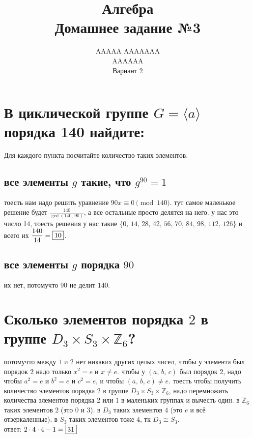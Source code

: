 \documentclass{article}
\title{Алгебра \\ Домашнее задание №3}
\author{AAAAA AAAAAAA \\ AAAAAA \\ Вариант 2}
\newcommand{\ds}{\displaystyle}
\newcommand{\Z}{\mathbb{Z}}
\renewcommand{\f}{\frac}
\begin{document}
  \maketitle

  \section{В циклической группе $G = \langle a \rangle$ порядка 140 найдите:}
  Для каждого пункта посчитайте количество таких элементов.
  \subsection{все элементы $g$ такие, что $g^{90} = 1$}
  тоесть нам надо решить уравнение $90x \equiv 0 \pmod{140}$.
  тут самое маленькое решение будет $\ds\f{140}{\gcd(140,\,90)}$,
  а все остальные просто делятся на него.
  у нас это число 14, тоесть решения у нас такие $\{0,\,14,\,28,\,42,\,56,\,70,\,84,\,98,\,112,\,126\}$
  и всего их $\ds \f{140}{14} = \fbox{10}$.
  \subsection{все элементы $g$ порядка $90$}
  их нет, потомучто $90$ не делит $140$.

  \section{Сколько элементов порядка $2$ в группе $D_3 \times S_3 \times \Z_6$?}
  потомучто между $1$ и $2$ нет никаких других целых чисел,
  чтобы у элемента был порядок $2$ надо только $x^2 = e$ и $x \neq e$.
  чтобы у $(a,\, b,\, c)$ был порядок $2$, надо чтобы $a^2 = e$ и $b^2 = e$ и $c^2 = e$, и чтобы $(a,\, b,\, c) \neq e$.
  тоесть чтобы получить количество элементов порядка $2$ в группе $D_3 \times S_3 \times \Z_6$,
  надо перемножить количества элементов порядка $2$ или $1$ в маленьких группах и вычесть один.
  в $\Z_6$ таких элементов $2$ (это $0$ и $3$).
  в $D_3$ таких элементов $4$ (это $e$ и всё отзеркаленные).
  в $S_3$ таких элементов тоже $4$, тк $D_3 \cong S_3$.
  \\ ответ: $2 \cdot 4 \cdot 4 - 1 = \fbox{31}$
\end{document}
